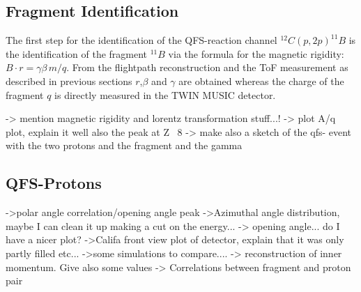 \subsection{Fragment Identification}
The first step for the identification of the QFS-reaction channel $^{12}C(p,2p)^{11}B$ is the identification of the fragment $^{11}B$ via the formula for the magnetic rigidity: $ B\cdot r = \gamma\beta \, m /q$. From the flightpath reconstruction and the ToF measurement as described in previous sections $r$,$\beta$ and $\gamma$ are obtained whereas the charge of the fragment $q$ is directly measured in the TWIN MUSIC detector. 


-> mention magnetic rigidity and lorentz transformation stuff...!
-> plot A/q plot, explain it well also the peak at Z ~8
-> make also a sketch of the qfs- event with the two protons and the fragment and the gamma
\subsection{QFS-Protons}
->polar angle correlation/opening angle peak
->Azimuthal angle distribution, maybe I can clean it up making a cut on the energy...
-> opening angle... do I have a nicer plot?
->Califa front view plot of detector, explain that it was only partly filled etc... 
->some simulations to compare....
-> reconstruction of inner momentum. Give also some values
-> Correlations between fragment and proton pair
